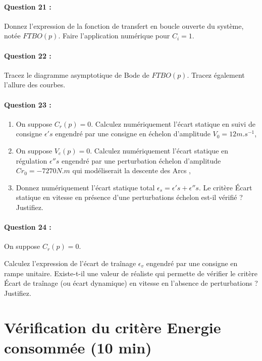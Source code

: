 \paragraph{Question 21 :} Donnez l'expression de la fonction de transfert en boucle ouverte du système, notée $FTBO(p)$. Faire l'application numérique pour $C_i=1$.

\paragraph{Question 22 :} Tracez le diagramme asymptotique de Bode de $FTBO(p)$. Tracez également l'allure des courbes.

\paragraph{Question 23 :}

\begin{enumerate}
 \item On suppose $C_r(p)=0$. Calculez numériquement l'écart statique en suivi de consigne $\epsilon's$ engendré par une consigne en échelon d'amplitude $V_0=12 m.s^{-1}$,
 \item On suppose $V_c(p)=0$. Calculez numériquement l'écart statique en régulation $\epsilon''s$ engendré par une perturbation échelon d'amplitude $Cr_0=-7270N.m$ qui modéliserait la descente des \og Arcs \fg,
 \item Donnez numériquement l'écart statique total $\epsilon_s=\epsilon's+\epsilon''s$. Le critère \og Écart statique en vitesse en présence d'une perturbations échelon \fg est-il vérifié ? Justifiez.
\end{enumerate}

\paragraph{Question 24 :} On suppose $C_r(p)=0$.

Calculez l'expression de l'écart de traînage $\epsilon_v$ engendré par une consigne en rampe unitaire. Existe-t-il une valeur de   réaliste qui permette de vérifier le critère \og Écart de traînage (ou écart dynamique) en vitesse en l'absence de perturbations \fg ? Justifiez.

\section{Vérification du critère \og Energie consommée \fg (10 min)}

